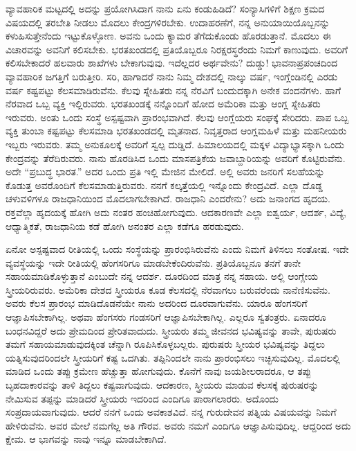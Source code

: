 ವ್ಯಾವಹಾರಿಕ ಮಟ್ಟದಲ್ಲಿ ಅದನ್ನು ಪ್ರಯೋಗಿಸಿದಾಗ ನಾನು ಏನು ಕಂಡುಹಿಡಿದೆ? ಸಂನ್ಯಾಸಿಗಳಿಗೆ ಶಿಕ್ಷಣ ಕ್ರಮದ ವಿಷಯದಲ್ಲಿ ತರಬೇತಿ ನೀಡಲು ಮೊದಲು ಕೇಂದ್ರಗಳಿರಬೇಕು. ಉದಾಹರಣೆಗೆ, ನನ್ನ ಅನುಯಾಯಿಯೊಬ್ಬನನ್ನು ಕಳುಹಿಸುತ್ತೇನೆಂದು ಇಟ್ಟುಕೊಳ್ಳೋಣ. ಅವನು ಒಂದು ಕ್ಯಾಮರ ತೆಗೆದುಕೊಂಡು ಹೊರಡುತ್ತಾನೆ. ಮೊದಲು ಈ ವಿಚಾರವನ್ನು ಅವನಿಗೆ ಕಲಿಸಬೇಕು. ಭರತಖಂಡದಲ್ಲಿ ಪ್ರತಿಯೊಬ್ಬರೂ ನಿರಕ್ಷರಸ್ಥರೆಂದು ನಿಮಗೆ ಕಾಣುವುದು. ಅವರಿಗೆ ಕಲಿಸಬೇಕಾದರೆ ಹಲವಾರು ಶಾಖೆಗಳು ಬೇಕಾಗುವುವು. ಇದೆಲ್ಲದರ ಅರ್ಥವೇನು? ದುಡ್ಡು! ಭಾವನಾಪ್ರಪಂಚದಿಂದ ವ್ಯಾವಹಾರಿಕ ಜಗತ್ತಿಗೆ ಬರುತ್ತೀರಿ. ಸರಿ, ಹಾಗಾದರೆ ನಾನು ನಿಮ್ಮ ದೇಶದಲ್ಲಿ ನಾಲ್ಕು ವರ್ಷ, ಇಂಗ್ಲೆಂಡಿನಲ್ಲಿ ಎರಡು ವರ್ಷ ಕಷ್ಟಪಟ್ಟು ಕೆಲಸಮಾಡಿರುವೆನು. ಕೆಲವು ಸ್ನೇಹಿತರು ನನ್ನ ನೆರವಿಗೆ ಬಂದುದಕ್ಕಾಗಿ ಅನೇಕ ವಂದನೆಗಳು. ಹಾಗೆ ನೆರವಾದ ಒಬ್ಬ ವ್ಯಕ್ತಿ ಇಲ್ಲಿರುವರು. ಭರತಖಂಡಕ್ಕೆ ನನ್ನೊಂದಿಗೆ ಹೋದ ಅಮೆರಿಕಾ ಮತ್ತು ಆಂಗ್ಲ ಸ್ನೇಹಿತರು ಇರುವರು. ಅಂತು ಒಂದು ಸಂಸ್ಥೆ ಅಸ್ಪಷ್ಟವಾಗಿ ಪ್ರಾರಂಭವಾಗಿದೆ. ಕೆಲವು ಆಂಗ್ಲೆಯರು ಸಂಘಕ್ಕೆ ಸೇರಿದರು. ಪಾಪ ಒಬ್ಬ ವ್ಯಕ್ತಿ ತುಂಬಾ ಕಷ್ಟಪಟ್ಟು ಕೆಲಸಮಾಡಿ ಭರತಖಂಡದಲ್ಲಿ ಮೃತನಾದ. ನಿವೃತ್ತರಾದ ಆಂಗ್ಲಮಹಿಳೆ ಮತ್ತು ಮಹನೀಯರು ಇಬ್ಬರು ಇರುವರು. ತಮ್ಮ ಅನುಕೂಲಕ್ಕೆ ಅವರಿಗೆ ಸ್ವಲ್ಪ ದುಡ್ಡಿದೆ. ಹಿಮಾಲಯದಲ್ಲಿ ಮಕ್ಕಳ ವಿದ್ಯಾಭ್ಯಾಸಕ್ಕಾಗಿ ಒಂದು ಕೇಂದ್ರವನ್ನು ತೆರೆದಿರುವರು. ನಾನು ಹೊರಡಿಸಿದ ಒಂದು ಮಾಸಪತ್ರಿಕೆಯ ಜವಾಬ್ದಾರಿಯನ್ನು ಅವರಿಗೆ ಕೊಟ್ಟಿರುವೆನು. ಅದೇ “ಪ್ರಬುದ್ಧ ಭಾರತ.” ಅದರ ಒಂದು ಪ್ರತಿ ಇಲ್ಲಿ ಮೇಜಿನ ಮೇಲಿದೆ. ಅಲ್ಲಿ ಅವರು ಜನರಿಗೆ ಸಲಹೆಯನ್ನು ಕೊಡುತ್ತ ಅವರೊಂದಿಗೆ ಕೆಲಸಮಾಡುತ್ತಿರುವರು. ನನಗೆ ಕಲ್ಕತ್ತೆಯಲ್ಲಿ ಇನ್ನೊಂದು ಕೇಂದ್ರವಿದೆ. ಎಲ್ಲಾ ದೊಡ್ಡ ಚಳುವಳಿಗಳೂ ರಾಜಧಾನಿಯಿಂದ ಮೊದಲಾಗಬೇಕಾಗಿದೆ. ರಾಜಧಾನಿ ಎಂದರೇನು? ಅದು ಜನಾಂಗದ ಹೃದಯ. ರಕ್ತವೆಲ್ಲಾ ಹೃದಯಕ್ಕೆ ಹೋಗಿ ಅದು ನಂತರ ಹಂಚಿಹೋಗುವುದು. ಆದಕಾರಣವೇ ಎಲ್ಲಾ ಐಶ್ವರ್ಯ, ಆದರ್ಶ, ವಿದ್ಯೆ, ಆಧ್ಯಾತ್ಮಿಕತೆ, ರಾಜಧಾನಿಯ ಕಡೆ ಹೋಗಿ ಅನಂತರ ಎಲ್ಲಾ ಕಡೆಗೂ ಹರಡುವುದು.

ಏನೋ ಅಸ್ಪಷ್ಟವಾದ ರೀತಿಯಲ್ಲಿ ಒಂದು ಸಂಸ್ಥೆಯನ್ನು ಪ್ರಾರಂಭಿಸಿರುವೆನು ಎಂದು ನಿಮಗೆ ತಿಳಿಸಲು ಸಂತೋಷ. ಇದೇ ವ್ಯವಸ್ಥೆಯನ್ನು ಇದೇ ರೀತಿಯಲ್ಲಿ ಹೆಂಗಸರಿಗೂ ಮಾಡಬೇಕೆಂದಿರುವೆನು. ಪ್ರತಿಯೊಬ್ಬನೂ ತನಗೆ ತಾನೇ ಸಹಾಯಮಾಡಿಕೊಳ್ಳುತ್ತಾನೆ ಎಂಬುದೇ ನನ್ನ ಆದರ್ಶ. ದೂರದಿಂದ ಮಾತ್ರ ನನ್ನ ಸಹಾಯ. ಅಲ್ಲಿ ಆಂಗ್ಲೇಯ ಸ್ತ್ರೀಯರಿರುವರು. ಅಮೆರಿಕಾ ದೇಶದ ಸ್ತ್ರೀಯರೂ ಕೂಡ ಕೆಲಸದಲ್ಲಿ ನೆರವಾಗಲು ಬರುವರೆಂದು ನಾನೆಣಿಸುವೆನು. ಅವರು ಕೆಲಸ ಪ್ರಾರಂಭ ಮಾಡಿದೊಡನೆಯೇ ನಾನು ಅದರಿಂದ ದೂರವಾಗುವೆನು. ಯಾರೂ ಹೆಂಗಸರಿಗೆ ಆಜ್ಞಾಪಿಸಬೇಕಾಗಿಲ್ಲ. ಅಥವಾ ಹೆಂಗಸರು ಗಂಡಸರಿಗೆ ಆಜ್ಞಾಪಿಸಬೇಕಾಗಿಲ್ಲ. ಎಲ್ಲರೂ ಸ್ವತಂತ್ರರು. ಏನಾದರೂ ಬಂಧನವಿದ್ದರೆ ಅದು ಪ್ರೇಮದಿಂದ ಪ್ರೇರಿತವಾದುದು. ಸ್ತ್ರೀಯರು ತಮ್ಮ ಜೀವನದ ಭವಿಷ್ಯವನ್ನು ತಾವೇ, ಪುರುಷರು ತಮಗೆ ಸಹಾಯಮಾಡುವುದಕ್ಕಿಂತ ಚೆನ್ನಾಗಿ ರೂಪಿಸಿಕೊಳ್ಳಬಲ್ಲರು. ಪುರುಷರು ಸ್ತ್ರೀಯರ ಭವಿಷ್ಯವನ್ನು ತಿದ್ದಲು ಯತ್ನಿಸುವುದರಿಂದಲೇ ಸ್ತ್ರೀಯರಿಗೆ ಕಷ್ಟ ಒದಗಿತು. ತಪ್ಪಿನಿಂದಲೇ ನಾನು ಪ್ರಾರಂಭಿಸಲು ಇಚ್ಛಿಸುವುದಿಲ್ಲ. ಮೊದಲಲ್ಲಿ ಮಾಡಿದ ಒಂದು ತಪ್ಪು ಕ್ರಮೇಣ ಹೆಚ್ಚುತ್ತಾ ಹೋಗುವುದು. ಕೊನೆಗೆ ನಾವು ಜಯಶೀಲರಾದರೂ, ಆ ತಪ್ಪು ಬೃಹದಾಕಾರವನ್ನು ತಾಳಿ ತಿದ್ದಲು ಕಷ್ಟವಾಗುವುದು. ಆದಕಾರಣ, ಸ್ತ್ರೀಯರು ಮಾಡುವ ಕೆಲಸಕ್ಕೆ ಪುರುಷರನ್ನು ನೇಮಿಸುವ ತಪ್ಪನ್ನು ಮಾಡಿದರೆ ಸ್ತ್ರೀಯರು ಇದರಿಂದ ಎಂದಿಗೂ ಪಾರಾಗಲಾರರು. ಅದೊಂದು ಸಂಪ್ರದಾಯವಾಗುವುದು. ಆದರೆ ನನಗೆ ಒಂದು ಅವಕಾಶವಿದೆ. ನನ್ನ ಗುರುದೇವನ ಪತ್ನಿಯ ವಿಷಯವನ್ನು ನಿಮಗೆ ಹೇಳಿರುವೆನು. ಅವರ ಮೇಲೆ ನಮಗೆಲ್ಲ ಅತಿ ಗೌರವ. ಅವರು ನಮಗೆ ಎಂದಿಗೂ ಆಜ್ಞಾಪಿಸುವುದಿಲ್ಲ. ಆದ್ದರಿಂದ ಅದು ಕ್ಷೇಮ. ಆ ಭಾಗವನ್ನು ನಾವು ಇನ್ನೂ ಮಾಡಬೇಕಾಗಿದೆ.

